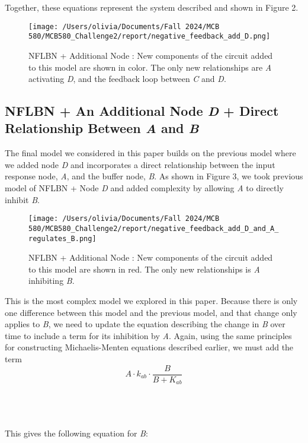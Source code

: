 \documentclass{article}
\begin{document}
Together, these equations represent the system described and shown in Figure 2. 

\begin{figure}[H]
    \centering
    \texttt{[image: /Users/olivia/Documents/Fall 2024/MCB 580/MCB580\_Challenge2/report/negative\_feedback\_add\_D.png]}
    \caption{NFLBN + Additional Node : New components of the circuit added to this model are shown in color. The only new relationships are \textit{A} activating \textit{D}, and the feedback loop between \textit{C} and \textit{D}.}
    \label{fig:2}
\end{figure}

\subsection{NFLBN + An Additional Node \textit{D} + Direct Relationship Between \textit{A} and \textit{B}}

The final model we considered in this paper builds on the previous model where we added node \textit{D} and incorporates a direct relationship between the input response node, \textit{A}, and the buffer node, \textit{B}. As shown in Figure 3, we took previous model of NFLBN + Node \textit{D} and added complexity by allowing \textit{A} to directly inhibit \textit{B}. 

\begin{figure}[H]
    \centering
    \texttt{[image: /Users/olivia/Documents/Fall 2024/MCB 580/MCB580\_Challenge2/report/negative\_feedback\_add\_D\_and\_A\_regulates\_B.png]}
    \caption{NFLBN + Additional Node : New components of the circuit added to this model are shown in red. The only new relationships is \textit{A} inhibiting \textit{B}.}
    \label{fig:3}
\end{figure}

This is the most complex model we explored in this paper. Because there is only one difference between this model and the previous model, and that change only applies to \textit{B}, we need to update the equation describing the change in \textit{B} over time to include a term for its inhibition by \textit{A}. Again, using the same principles for constructing Michaelis-Menten equations described earlier, we must add the term
\\

\[A \cdot k_{ab} \cdot \frac{B}{B + K_{ab}}\]

\\
\\
\\
This gives the following equation for \textit{B}:
\end{document}
